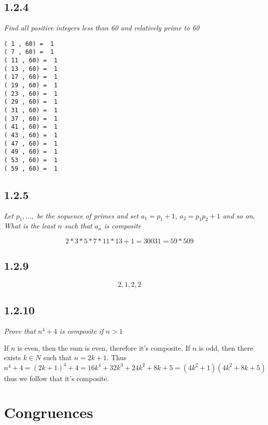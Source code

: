 \documentclass[11pt,oneside,titlepage]{book}
\begin{document}
\subsection*{1.2.4}

\textit{Find all positive integers less than 60 and relatively prime to 60}

\begin{verbatim}
( 1 , 60) =  1
( 7 , 60) =  1
( 11 , 60) =  1
( 13 , 60) =  1
( 17 , 60) =  1
( 19 , 60) =  1
( 23 , 60) =  1
( 29 , 60) =  1
( 31 , 60) =  1
( 37 , 60) =  1
( 41 , 60) =  1
( 43 , 60) =  1
( 47 , 60) =  1
( 49 , 60) =  1
( 53 , 60) =  1
( 59 , 60) =  1
\end{verbatim}

\subsection*{1.2.5}

\textit{Let $p_1, ..., $ be the sequence of primes and set $a_1 = p_1 + 1$,
  $a_2 = p_1 p_2 + 1$ and so on. What is the least $n$ such that $a_n$ is composite}


$$2 * 3 * 5 * 7 * 11 * 13 + 1 = 30031 = 59 * 509$$

\subsection*{1.2.9}

$$2, 1, 2, 2$$

\subsection*{1.2.10}

\textit{Prove that $n^4 + 4$ is composite if $n > 1$}

If $n$ is even, then the sum is even, therefore it's composite. If $n$ is odd, then there exists
$k \in N$ such that $n = 2k + 1$. Thus
$$n^4 + 4 = (2k + 1)^4 + 4 = 16k^4 + 32 k^3 + 24k^2 + 8k + 5 = (4k^2 + 1)(4k^2 + 8k + 5)$$
thus we follow that it's composite.

\section{Congruences}
\end{document}
